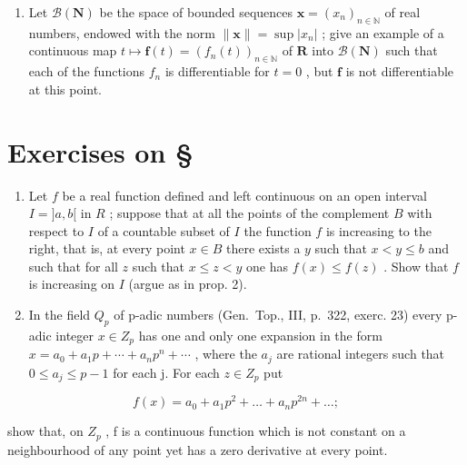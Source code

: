 \begin{enumerate}
\def\labelenumi{\arabic{enumi})}
\setcounter{enumi}{8}
\tightlist
\item
  Let \(\mathcal{B}(\mathbf{N})\) be the space of bounded sequences \(\mathbf{x} = (x_n)_{n\in \mathbb{N}}\) of real numbers, endowed with the norm \(\| \mathbf{x}\| = \sup |x_n|\) ; give an example of a continuous map \(t\mapsto \mathbf{f}(t) = (f_n(t))_{n\in \mathbb{N}}\) of \(\mathbf{R}\) into \(\mathcal{B}(\mathbf{N})\) such that each of the functions \(f_{n}\) is differentiable for \(t = 0\) , but \(\mathbf{f}\) is not differentiable at this point.
\end{enumerate}

\setcounter{exercisegroup}{1}
\section*{Exercises on \S{}}
{}

\begin{enumerate}
\def\labelenumi{\arabic{enumi})}
\item
  Let \(f\) be a real function defined and left continuous on an open interval \(I = ]a, b[\) in \(R\) ; suppose that at all the points of the complement \(B\) with respect to \(I\) of a countable subset of \(I\) the function \(f\) is increasing to the right, that is, at every point \(x \in B\) there exists a \(y\) such that \(x < y \leqslant b\) and such that for all \(z\) such that \(x \leqslant z < y\) one has \(f(x) \leqslant f(z)\) . Show that \(f\) is increasing on \(I\) (argue as in prop. 2).
\item
  In the field \(Q_{p}\) of p-adic numbers (Gen.~Top., III, p.~322, exerc. 23) every p-adic integer \(x \in Z_{p}\) has one and only one expansion in the form \(x = a_{0} + a_{1}p + \cdots + a_{n}p^{n} + \cdots\) , where the \(a_{j}\) are rational integers such that \(0 \leqslant a_{j} \leqslant p - 1\) for each j. For each \(z \in Z_{p}\) put
\end{enumerate}

\[
f (x) = a _ {0} + a _ {1} p ^ {2} + \dots + a _ {n} p ^ {2 n} + \dots ;
\]

show that, on \(Z_{p}\) , f is a continuous function which is not constant on a neighbourhood of any point yet has a zero derivative at every point.

